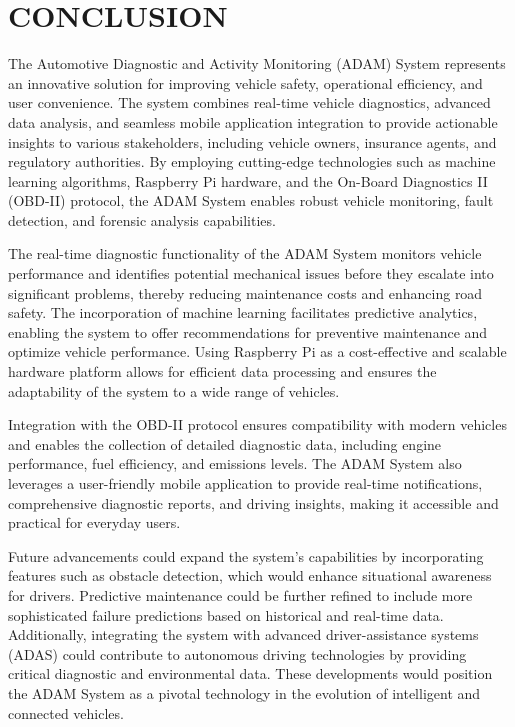 \newpage
\chapter{CONCLUSION}

The Automotive Diagnostic and Activity Monitoring (ADAM) System represents 
an innovative solution for improving vehicle safety, operational efficiency, and 
user convenience. The system combines real-time vehicle diagnostics, advanced 
data analysis, and seamless mobile application integration to provide actionable 
insights to various stakeholders, including vehicle owners, insurance agents, and 
regulatory authorities. By employing cutting-edge technologies such as machine 
learning algorithms, Raspberry Pi hardware, and the On-Board Diagnostics II 
(OBD-II) protocol, the ADAM System enables robust vehicle monitoring, fault 
detection, and forensic analysis capabilities.

\vspace{1em} %

The real-time diagnostic functionality of the ADAM System monitors vehicle 
performance and identifies potential mechanical issues before they escalate into 
significant problems, thereby reducing maintenance costs and enhancing road 
safety. The incorporation of machine learning facilitates predictive analytics, 
enabling the system to offer recommendations for preventive maintenance and 
optimize vehicle performance. Using Raspberry Pi as a cost-effective and scalable 
hardware platform allows for efficient data processing and ensures the adaptability 
of the system to a wide range of vehicles.

\vspace{1em} %

Integration with the OBD-II protocol ensures compatibility with modern vehicles 
and enables the collection of detailed diagnostic data, including engine 
performance, fuel efficiency, and emissions levels. The ADAM System also 
leverages a user-friendly mobile application to provide real-time notifications, 
comprehensive diagnostic reports, and driving insights, making it accessible and 
practical for everyday users.

\vspace{1em} %

Future advancements could expand the system’s capabilities by incorporating 
features such as obstacle detection, which would enhance situational awareness for 
drivers. Predictive maintenance could be further refined to include more 
sophisticated failure predictions based on historical and real-time data. 
Additionally, integrating the system with advanced driver-assistance systems 
(ADAS) could contribute to autonomous driving technologies by providing critical 
diagnostic and environmental data. These developments would position the 
ADAM System as a pivotal technology in the evolution of intelligent and 
connected vehicles.
